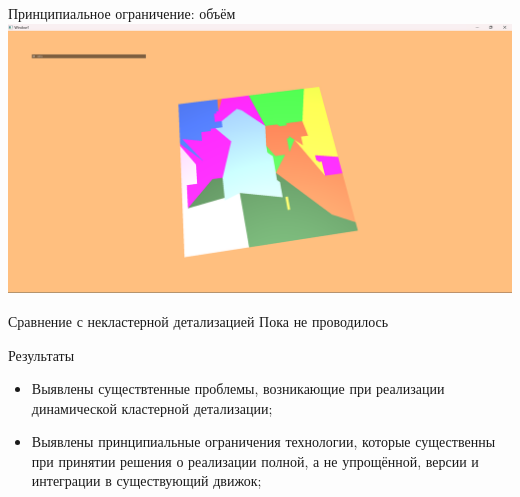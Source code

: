 \documentclass{beamer}
\begin{document}
    \begin{frame}{Принципиальное ограничение: объём}
        \includegraphics[width=\textwidth]{plane1.png}
    \end{frame}

    \begin{frame}{Сравнение с некластерной детализацией}
        Пока не проводилось
    \end{frame}

    \begin{frame}{Результаты}
        \begin{itemize}
            \item Выявлены существтенные проблемы,
            возникающие при реализации
            динамической кластерной детализации;

            \item Выявлены принципиальные
            ограничения технологии,
            которые существенны при принятии решения
            о реализации полной, а не упрощённой,
            версии и интеграции в существующий движок;
        \end{itemize}
    \end{frame}
\end{document}
